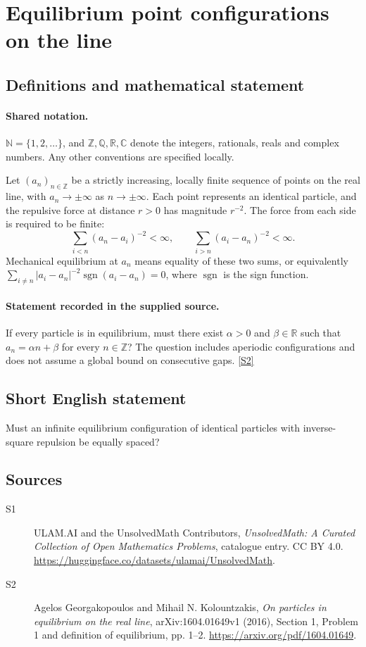 \documentclass[11pt]{article}
\newcommand{\sref}[2]{\hyperlink{source:#1:#2}{[S#2]}}
\begin{document}
\section{Equilibrium point configurations on the line}\label{statement}

\subsection{Definitions and mathematical statement}

\paragraph{Shared notation.}$\mathbb N=\{1,2,\ldots\}$, and $\mathbb Z,\mathbb Q,\mathbb R,\mathbb C$ denote the integers, rationals, reals and complex numbers. Any other conventions are specified locally.


Let $(a_n)_{n\in\mathbb Z}$ be a strictly increasing, locally finite sequence of points on the real line, with $a_n\to\pm\infty$ as $n\to\pm\infty$. Each point represents an identical particle, and the repulsive force at distance $r>0$ has magnitude $r^{-2}$. The force from each side is required to be finite:
\[\sum_{i<n}(a_n-a_i)^{-2}<\infty,\qquad \sum_{i>n}(a_i-a_n)^{-2}<\infty.\]
Mechanical equilibrium at $a_n$ means equality of these two sums, or equivalently $\sum_{i\ne n}|a_i-a_n|^{-2}\operatorname{sgn}(a_i-a_n)=0$, where $\operatorname{sgn}$ is the sign function.
\paragraph{Statement recorded in the supplied source.}
If every particle is in equilibrium, must there exist $\alpha>0$ and $\beta\in\mathbb R$ such that $a_n=\alpha n+\beta$ for every $n\in\mathbb Z$? The question includes aperiodic configurations and does not assume a global bound on consecutive gaps. \sref{statement}{2}
\subsection{Short English statement}
Must an infinite equilibrium configuration of identical particles with inverse-square repulsion be equally spaced?
\subsection{Sources}
\begin{description}
\item[\hypertarget{source:statement:1}{S1}] ULAM.AI and the UnsolvedMath Contributors, \emph{UnsolvedMath: A Curated Collection of Open Mathematics Problems}, catalogue entry. CC BY 4.0. \url{https://huggingface.co/datasets/ulamai/UnsolvedMath}.
\item[\hypertarget{source:statement:2}{S2}] Agelos Georgakopoulos and Mihail N. Kolountzakis, \emph{On particles in equilibrium on the real line}, arXiv:1604.01649v1 (2016), Section 1, Problem 1 and definition of equilibrium, pp. 1--2. \url{https://arxiv.org/pdf/1604.01649}.
\end{description}
\label{end:statement}
\end{document}
